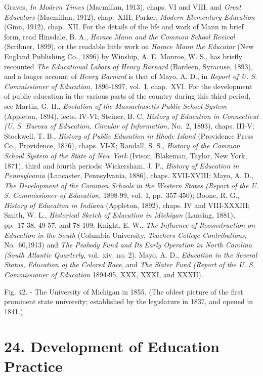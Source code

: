 \documentclass[
]{book}
\begin{document}
Graves, \emph{In Modern Times} (Macmillan, 1913), chaps. VI and VIII, and \emph{Great Educators} (Macmillan, 1912), chap.~XIII; Parker, \emph{Modern Elementary Education} (Ginn, 1912), chap.~XII. For the details of the life and work of Mann in brief form, read Hinsdale, B. A., \emph{Horace Mann and the Common School Revival} (Scribner, 1899), or the readable little work on \emph{Horace Mann the Educator} (New England Publishing Co., 1896) by Winship, A. E. Monroe, W. S., has briefly recounted \emph{The Educational Labors of Henry Barnard} (Bardeen, Syracuse, 1893), and a longer account of \emph{Henry Barnard} is that of Mayo, A. D., in \emph{Report of U. S. Commissioner of Education,} 1896-1897, vol.~I, chap.~XVI. For the development of public education in the various parts of the country during this third period, see Martin, G. H., \emph{Evolution of the Massachusetts Public School System} (Appleton, 1894), lects. IV-VI; Steiner, B. C, \emph{History of Education in Connecticut (U. S. Bureau of Education, Circular of Information,} No.~2, 1893), chaps. III-V; Stockwell, T. B., \emph{History of Public Education in Rhode Island} (Providence Press Co., Providence, 1876), chaps. VI-X; Randall, S. S., \emph{History of the Common School System of the State of New York} (Ivison, Blakeman, Taylor, New York, 1871), third and fourth periods; Wickersham, J. P., \emph{History of Education in Pennsylvania} (Lancaster, Pennsylvania, 1886), chaps. XVII-XVIII; Mayo, A. D., \emph{The Development of the Common Schools in the Western States (Report of the U. S. Commissioner of Education,} 1898-99, vol.~I, pp.~357-450); Boone, R. G., \emph{History of Education in Indiana} (Appleton, 1892), chaps. IV and VIII-XXXIII; Smith, W. L., \emph{Historical Sketch of Education in Michigan} (Lansing, 1881), pp.~17-38, 49-57, and 78-109; Knight, E. W., \emph{The Influence of Reconstruction on Education in the South} (Columbia University, \emph{Teachers College Contributions,} No.~60,1913) and \emph{The Peabody Fund and Its Early Operation in North Carolina (South Atlantic Quarterly,} vol.~xiv. no. 2). Mayo, A. D., \emph{Education in the Several Status, Education oj the Colored Race,} and \emph{The Slater Fund (Report of the U. S. Commissioner of Education} 1894-95, XXX, XXXI, and XXXII).

Fig. 42. - The University of Michigan in 1855. (The oldest picture of the first prominent state university; established by the legislature in 1837, and opened in 1841.)

\hypertarget{development-of-education-practice}{%
\chapter{24. Development of Education Practice}\label{development-of-education-practice}}
\end{document}
